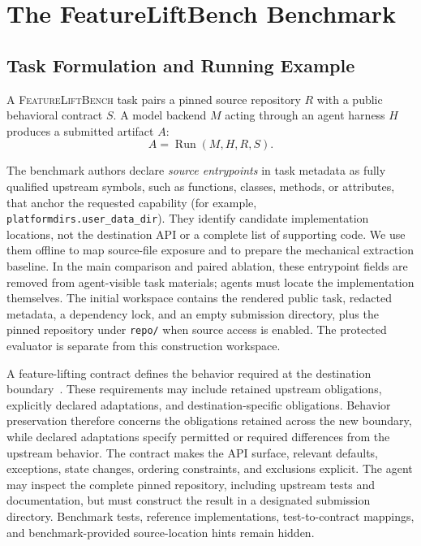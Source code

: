 \documentclass[acmsmall,screen,review,anonymous]{acmart}
\newcommand{\flb}{\textsc{FeatureLiftBench}\xspace}
\begin{document}
\section{The FeatureLiftBench Benchmark}
\label{sec:benchmark}

\subsection{Task Formulation and Running Example}

A \flb task pairs a pinned source repository $R$ with a public behavioral
contract $S$. A model backend $M$ acting through an agent harness $H$ produces
a submitted artifact $A$:
\begin{equation}
  A = \operatorname{Run}(M,H,R,S).
\end{equation}

The benchmark authors declare \emph{source entrypoints} in task metadata as
fully qualified upstream symbols, such as functions, classes, methods, or
attributes, that anchor the requested
capability (for example, \texttt{platformdirs.user\_data\_dir}). They identify
candidate implementation locations, not the destination API or a complete list
of supporting code. We use them offline to map source-file exposure and to
prepare the mechanical extraction baseline. In the main comparison and paired
ablation, these entrypoint fields are removed from agent-visible task materials;
agents must locate the implementation themselves. The initial workspace contains
the rendered public task, redacted metadata, a dependency lock, and an empty
submission directory, plus the pinned repository under \texttt{repo/} when
source access is enabled. The protected evaluator is separate from this
construction workspace.

A feature-lifting contract defines the behavior required at the destination
boundary~\cite{meyer1992contract}. These requirements may include retained upstream
obligations, explicitly declared adaptations, and destination-specific obligations.
Behavior preservation therefore concerns the obligations retained across the new
boundary, while declared adaptations specify permitted or required differences
from the upstream behavior. The contract makes the API surface, relevant defaults,
exceptions, state changes, ordering constraints, and exclusions explicit.
The agent may inspect the complete pinned repository,
including upstream tests and documentation, but must construct the result in a
designated submission directory. Benchmark tests, reference implementations,
test-to-contract mappings, and benchmark-provided source-location hints remain
hidden.
\end{document}
